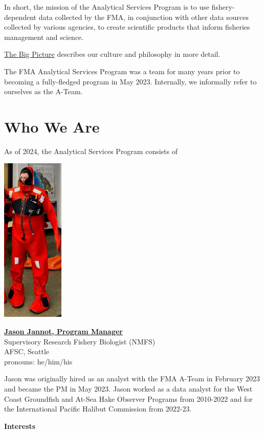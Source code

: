 \documentclass[
  letterpaper,
  DIV=11,
  numbers=noendperiod]{scrreprt}
\begin{document}
In short, the mission of the Analytical Services Program is to use
fishery-dependent data collected by the FMA, in conjunction with other
data sources collected by various agencies, to create scientific
products that inform fisheries management and science.

\hyperref[sec-big_picture]{The Big Picture} describes our culture and
philosophy in more detail.

The FMA Analytical Services Program was a team for many years prior to
becoming a fully-fledged program in May 2023. Internally, we informally
refer to ourselves as the A-Team.

\section{Who We Are}\label{who-we-are}

As of 2024, the Analytical Services Program consists of

\includegraphics[width=\textwidth,height=3.125in]{_img/JJ_immersionsuit.jpg}

\href{https://www.fisheries.noaa.gov/contact/jason-e-jannot}{\textbf{Jason
Jannot, Program Manager}}\\
Supervisory Research Fishery Biologist (NMFS)\\
AFSC, Seattle\\
pronouns: he/him/his

Jason was originally hired as an analyst with the FMA A-Team in February
2023 and became the PM in May 2023. Jason worked as a data analyst for
the West Coast Groundfish and At-Sea Hake Observer Programs from
2010-2022 and for the International Pacific Halibut Commission from
2022-23.

\textbf{Interests}
\end{document}

